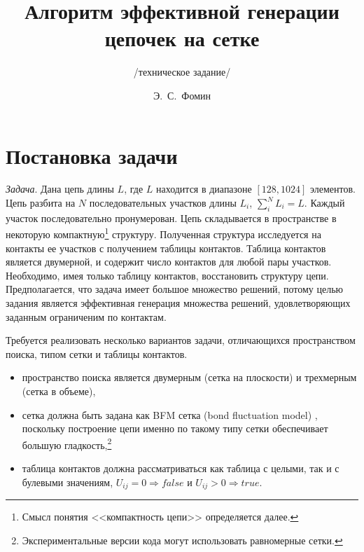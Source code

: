 \documentclass[tikz,a4paper]{scrartcl} %
\begin{document}
\title{Алгоритм эффективной генерации цепочек на сетке}
\subtitle{/техническое задание/}
\author{Э.~С.~Фомин}
\date{} %
\maketitle
\large %


\section*{Постановка задачи}
\textit{Задача}. Дана цепь длины $L$, где $L$ находится в диапазоне $[128, 1024]$ элементов. Цепь разбита на $N$ последовательных участков длины $L_i$, $\sum_i^N L_i = L$. Каждый участок последовательно пронумерован. Цепь складывается в пространстве в некоторую компактную\footnote{Смысл понятия <<компактность цепи>> определяется далее.} структуру. Полученная структура исследуется на контакты ее участков с получением таблицы контактов. Таблица контактов является двумерной, и содержит число контактов для любой пары участков. Необходимо, имея только таблицу контактов, восстановить структуру цепи. Предполагается, что задача имеет большое множество решений, потому целью задания является эффективная генерация множества решений, удовлетворяющих заданным ограниченим по контактам.

Требуется реализовать несколько вариантов задачи, отличающихся пространством поиска, типом сетки и таблицы контактов.
\begin{itemize}
\item пространство поиска является двумерным (сетка на плоскости) и трехмерным (сетка в объеме),
\item сетка должна быть задана как BFM сетка (bond fluctuation model) \cite{BMF1994}, поскольку построение цепи именно по такому типу сетки обеспечивает большую гладкость,\footnote {Экспериментальные версии кода могут использовать равномерные сетки.}
\item таблица контактов должна рассматриваться как таблица с целыми, так и с булевыми значениям, $U_{ij} = 0 \Rightarrow false$ и $U_{ij} > 0 \Rightarrow true$.
\end{itemize}
\end{document}
